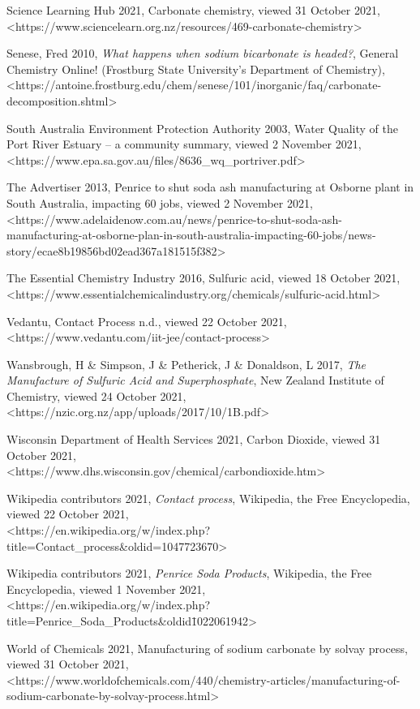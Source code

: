 \documentclass[12pt, a4paper]{article}
\begin{document}
Science Learning Hub 2021, Carbonate chemistry, viewed 31 October 2021, \\ \textless{https://www.sciencelearn.org.nz/resources/469-carbonate-chemistry}\textgreater

Senese, Fred 2010, \emph{What happens when sodium bicarbonate is headed?}, General Chemistry Online! (Frostburg State University's Department of Chemistry), \\ \textless{https://antoine.frostburg.edu/chem/senese/101/inorganic/faq/carbonate-decomposition.shtml}\textgreater

South Australia Environment Protection Authority 2003, Water Quality of the Port River Estuary – a community summary, viewed 2 November 2021, \\ \textless{https://www.epa.sa.gov.au/files/8636\_wq\_portriver.pdf}\textgreater

The Advertiser 2013, Penrice to shut soda ash manufacturing at Osborne plant in South Australia, impacting 60 jobs, viewed 2 November 2021, \\ \textless{https://www.adelaidenow.com.au/news/penrice-to-shut-soda-ash-manufacturing-at-osborne-plan-in-south-australia-impacting-60-jobs/news-story/ecae8b19856bd02ead367a181515f382}\textgreater

The Essential Chemistry Industry 2016, Sulfuric acid, viewed 18 October 2021, \\ \textless{https://www.essentialchemicalindustry.org/chemicals/sulfuric-acid.html}\textgreater

Vedantu, Contact Process n.d., viewed 22 October 2021, \\ \textless{https://www.vedantu.com/iit-jee/contact-process}\textgreater

Wansbrough, H \& Simpson, J \& Petherick, J \& Donaldson, L 2017, \emph{The Manufacture of Sulfuric Acid and Superphosphate}, New Zealand Institute of Chemistry, viewed 24 October 2021, \\ \textless{https://nzic.org.nz/app/uploads/2017/10/1B.pdf}\textgreater

Wisconsin Department of Health Services 2021, Carbon Dioxide, viewed 31 October 2021, \\ \textless{https://www.dhs.wisconsin.gov/chemical/carbondioxide.htm}\textgreater

Wikipedia contributors 2021, \emph{Contact process}, Wikipedia, the Free Encyclopedia, viewed 22 October 2021, \\ \textless{https://en.wikipedia.org/w/index.php?title=Contact\_process\&oldid=1047723670}\textgreater

Wikipedia contributors 2021, \emph{Penrice Soda Products}, Wikipedia, the Free Encyclopedia, viewed 1 November 2021, \\ \textless{https://en.wikipedia.org/w/index.php?title=Penrice\_Soda\_Products\&oldid\=1022061942}\textgreater

World of Chemicals 2021, Manufacturing of sodium carbonate by solvay process, viewed 31 October 2021, \\ \textless{https://www.worldofchemicals.com/440/chemistry-articles/manufacturing-of-sodium-carbonate-by-solvay-process.html}\textgreater
\end{document}
